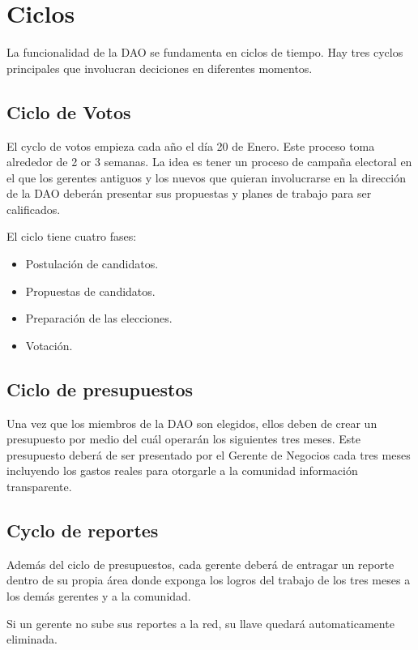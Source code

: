 \documentclass{article}
\begin{document}
\section{Ciclos}

La funcionalidad de la DAO se fundamenta en ciclos de tiempo. Hay tres cyclos principales que involucran deciciones en diferentes momentos.

\subsection{Ciclo de Votos}

El cyclo de votos empieza cada año el día 20 de Enero. Este proceso toma alrededor de 2 or 3 semanas. La idea es tener un proceso de campaña electoral en el que los gerentes antiguos y los nuevos que quieran involucrarse en la dirección de la DAO deberán presentar sus propuestas y planes de trabajo para ser calificados.

El ciclo tiene cuatro fases:

\begin{itemize}
  \item Postulación de candidatos.
  \item Propuestas de candidatos.
  \item Preparación de las elecciones.
  \item Votación.
\end{itemize}

\subsection{Ciclo de presupuestos}

Una vez que los miembros de la DAO son elegidos, ellos deben de crear un presupuesto por medio del cuál operarán los siguientes tres meses. Este presupuesto deberá de ser presentado por el Gerente de Negocios cada tres meses incluyendo los gastos reales para otorgarle a la comunidad información transparente.

\subsection{Cyclo de reportes}

Además del ciclo de presupuestos, cada gerente deberá de entragar un reporte dentro de su propia área donde exponga los logros del trabajo de los tres meses a los demás gerentes y a la comunidad.

Si un gerente no sube sus reportes a la red, su llave quedará automaticamente eliminada.
\end{document}
